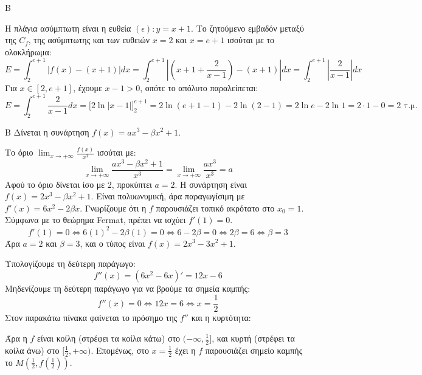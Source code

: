 \begin{thema}{Β}
\begin{erwthma}
\item Η πλάγια ασύμπτωτη είναι η ευθεία $(\epsilon): y = x+1$.
Το ζητούμενο εμβαδόν μεταξύ της $C_f$, της ασύμπτωτης και των ευθειών $x=2$ και $x=e+1$ ισούται με το ολοκλήρωμα:
\[ E = \int_2^{e+1} |f(x) - (x+1)| dx = \int_2^{e+1} \left| \left( x+1+\frac{2}{x-1} \right) - (x+1) \right| dx = \int_2^{e+1} \left| \frac{2}{x-1} \right| dx \]
Για $x \in [2, e+1]$, έχουμε $x-1 > 0$, οπότε το απόλυτο παραλείπεται:
\[ E = \int_2^{e+1} \frac{2}{x-1} dx = \Big[ 2\ln|x-1| \Big]_2^{e+1} = 2\ln(e+1-1) - 2\ln(2-1) = 2\ln e - 2\ln 1 = 2 \cdot 1 - 0 = 2 \text{ τ.μ.} \]
\end{erwthma}
\end{thema}

\begin{thema}{Β}
Δίνεται η συνάρτηση $f(x) = a x^3 - \beta x^2 + 1$.
\begin{erwthma}
\item Το όριο $\lim_{x\to+\infty} \frac{f(x)}{x^3}$ ισούται με:
\[ \lim_{x\to+\infty} \frac{a x^3 - \beta x^2 + 1}{x^3} = \lim_{x\to+\infty} \frac{a x^3}{x^3} = a \]
Αφού το όριο δίνεται ίσο με 2, προκύπτει $a=2$.
Η συνάρτηση είναι $f(x) = 2x^3 - \beta x^2 + 1$. Είναι πολυωνυμική, άρα παραγωγίσιμη με $f'(x) = 6x^2 - 2\beta x$.
Γνωρίζουμε ότι η $f$ παρουσιάζει τοπικό ακρότατο στο $x_0 = 1$. Σύμφωνα με το θεώρημα Fermat, πρέπει να ισχύει $f'(1) = 0$.
\[ f'(1) = 0 \Leftrightarrow 6(1)^2 - 2\beta(1) = 0 \Leftrightarrow 6 - 2\beta = 0 \Leftrightarrow 2\beta = 6 \Leftrightarrow \beta = 3 \]
Άρα $a=2$ και $\beta=3$, και ο τύπος είναι $f(x) = 2x^3 - 3x^2 + 1$.

\item Υπολογίζουμε τη δεύτερη παράγωγο:
\[ f''(x) = (6x^2 - 6x)' = 12x - 6 \]
Μηδενίζουμε τη δεύτερη παράγωγο για να βρούμε τα σημεία καμπής:
\[ f''(x) = 0 \Leftrightarrow 12x = 6 \Leftrightarrow x = \frac{1}{2} \]
Στον παρακάτω πίνακα φαίνεται το πρόσημο της $f''$ και η κυρτότητα:
\begin{center}
\end{center}
Άρα η $f$ είναι κοίλη (στρέφει τα κοίλα κάτω) στο $(-\infty, \frac{1}{2}]$, και κυρτή (στρέφει τα κοίλα άνω) στο $[\frac{1}{2}, +\infty)$. Επομένως, στο $x=\frac{1}{2}$ έχει η $f$ παρουσιάζει σημείο καμπής το $Μ\left(\frac{1}{2}, f\left(\frac{1}{2}\right)\right)$.


\end{erwthma}
\end{thema}
